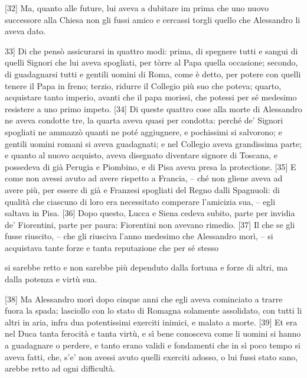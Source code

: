{[}32{]} Ma, quanto alle future, lui aveva a dubitare im prima che uno
nuovo successore alla Chiesa non gli fussi amico e cercassi torgli
quello che Alessandro li aveva dato. \linebreak

\quebra

\noindent{}{[}33{]} Di che pensò assicurarsi
in quattro modi: prima, di spegnere tutti e sangui di quelli Signori che
lui aveva spogliati, per tòrre al Papa quella occasione; secondo, di
guadagnarsi tutti e gentili uomini di Roma, come è detto, per potere con
quelli tenere il Papa in freno; terzio, ridurre il Collegio più suo che
poteva; quarto, acquistare tanto imperio, avanti che il papa morissi,
che potessi per sé medesimo resistere a uno primo impeto. {[}34{]} Di
queste quattro cose alla morte di Alessandro ne aveva condotte tre, la
quarta aveva quasi per condotta: perché de' Signori spogliati ne ammazzò
quanti ne poté aggiugnere, e pochissimi si salvorono; e gentili uomini
romani si aveva guadagnati; e nel Collegio aveva grandissima parte; e
quanto al nuovo acquisto, aveva disegnato diventare signore di Toscana,
e possedeva di già Perugia e Piombino, e di Pisa aveva presa la
protectione. {[}35{]} E come non avessi avuto ad avere rispetto a
Francia, -- ché non gliene aveva ad avere più, per essere di già e
Franzesi spogliati del Regno dalli Spagnuoli: di qualità che ciascuno di
loro era necessitato comperare l'amicizia sua, -- egli saltava in Pisa.
{[}36{]} Dopo questo, Lucca e Siena cedeva subito, parte per invidia de'
Fiorentini, parte per paura: Fiorentini non avevano rimedio. {[}37{]} Il
che se gli fusse riuscito, -- che gli riusciva l'anno medesimo che
Alessandro morì, -- si acquistava tante forze e tanta reputazione che per sé stesso 

\quebra

\noindent{}si sarebbe retto e non sarebbe più dependuto dalla fortuna
e forze di altri, ma dalla potenza e virtù sua.

{[}38{]} Ma Alessandro morì dopo cinque anni che egli aveva cominciato a
trarre fuora la spada; lasciollo con lo stato di Romagna solamente
assolidato, con tutti li altri in aria, infra dua potentissimi exerciti
inimici, e malato a morte. {[}39{]} Et era nel Duca tanta ferocità e
tanta virtù, e sì bene conosceva come li uomini si hanno a guadagnare o
perdere, e tanto erano validi e fondamenti che in sì poco tempo si aveva
fatti, che, s'e' non avessi avuto quelli exerciti adosso, o lui fussi
stato sano, arebbe retto ad ogni difficultà.

